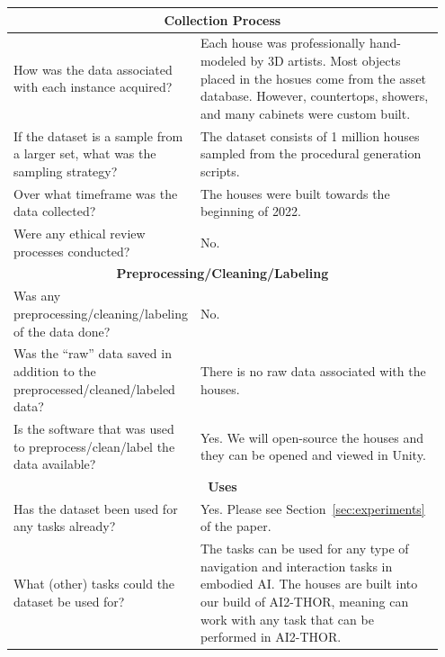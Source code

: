 \begin{longtable}{p{0.35\linewidth} |p{0.6\linewidth} }
    \bottomrule
        \multicolumn{2}{c}{\rule{0in}{0.2in}\textbf{Collection Process}\vspace{0.10in}}\\
    \toprule
    How was the data associated with each instance acquired? & Each house was professionally hand-modeled by 3D artists. Most objects placed in the hosues come from the \env{} asset database. However, countertops, showers, and many cabinets were custom built.\\[0.15in]
    \midrule
    If the dataset is a sample from a larger set, what was the sampling strategy? & The dataset consists of 1 million houses sampled from the procedural generation scripts.\\[0.15in]
    \midrule
    Over what timeframe was the data collected? & The houses were built towards the beginning of 2022.\\[0.15in]
    \midrule
    Were any ethical review processes conducted? & No.\\
    \bottomrule
        \multicolumn{2}{c}{\rule{0in}{0.2in}\textbf{Preprocessing/Cleaning/Labeling}\vspace{0.10in}}\\
    \toprule
    Was any preprocessing/cleaning/labeling of the data done? & No.\\[0.15in]
    \midrule
    Was the ``raw'' data saved in addition to the preprocessed/cleaned/labeled data? & There is no raw data associated with the \elienv{} houses.\\[0.15in]
    \midrule
    Is the software that was used to preprocess/clean/label the data available? & Yes. We will open-source the \elienv{} houses and they can be opened and viewed in Unity.\\
    \bottomrule
        \multicolumn{2}{c}{\rule{0in}{0.2in}\textbf{Uses}\vspace{0.10in}}\\
    \toprule
    Has the dataset been used for any tasks already? & Yes. Please see Section~\ref{sec:experiments} of the paper.\\[0.15in]
    \midrule
    What (other) tasks could the dataset be used for? & The tasks can be used for any type of navigation and interaction tasks in embodied AI. The houses are built into our build of AI2-THOR, meaning \elienv{} can work with any task that can be performed in AI2-THOR.\newline
    

\end{longtable}
